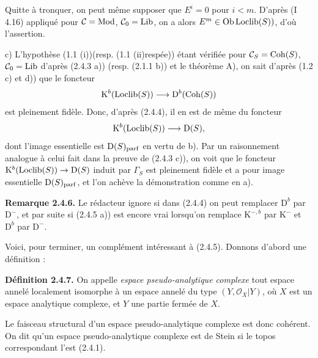 Quitte à tronquer, on peut même supposer que $E^i=0$ pour $i<m$. D'après (I 4.16) appliqué pour $\mathcal C=\Mod$, $\mathcal C_0=\Lib$, on a alors $E^m\in\Ob\Loclib(S))$, d'où l'assertion.

c) L'hypothèse (1.1 (i))(resp. (1.1 (ii)respée)) étant vérifiée pour $\mathcal C_S=\Coh(S)$, $\mathcal C_0=\Lib$ d'après (2.4.3 a)) (resp. (2.1.1 b)) et le théorème A), on sait d'après (1.2 c) et d)) que le foncteur
\[
\mathrm K^b(\Loclib(S))\longrightarrow\mathrm D^b(\Coh(S))
\]
est pleinement fidèle. Donc, d'après (2.4.4), il en est de même du foncteur
\[
\mathrm K^b(\Loclib(S))\longrightarrow\mathrm D(S),
\]
dont l'image essentielle est $\mathrm D(S)_{\parf}$ en vertu de b). Par un raisonnement analogue à celui fait dans la preuve de (2.4.3 c)), on voit que le foncteur $\mathrm K^b(\Loclib(S))\to\mathrm D(S)$ induit par $\Gamma_S$ est pleinement fidèle et a pour image essentielle $\mathrm D(S)_{\parf}$, et l'on achève la démonstration comme en a).

\textbf{Remarque 2.4.6.} Le rédacteur ignore si dans (2.4.4) on peut remplacer $\mathrm D^b$ par $\mathrm D^{-}$, et par suite si (2.4.5 a)) est encore vrai lorsqu'on remplace $\mathrm K^{-,b}$ par $\mathrm K^{-}$ et $\mathrm D^b$ par $\mathrm D^{-}$.

Voici, pour terminer, un complément intéressant à (2.4.5). Donnons d'abord une définition :

\textbf{Définition 2.4.7.} On appelle \emph{espace pseudo-analytique complexe} tout espace annelé localement isomorphe à un espace annelé du type $(Y,\mathcal O_X|Y)$, où $X$ est un espace analytique complexe, et $Y$ une partie fermée de $X$.

Le faisceau structural d'un espace pseudo-analytique complexe est donc cohérent. On dit qu'un espace pseudo-analytique complexe est de Stein si le topos correspondant l'est (2.4.1).



\providecommand{\Qcoh}{\operatorname{Qcoh}}
\providecommand{\Mod}{\operatorname{Mod}}
\providecommand{\Coh}{\operatorname{Coh}}
\renewcommand{\Ob}{\operatorname{Ob}}
\providecommand{\Hom}{\operatorname{Hom}}
\providecommand{\Ext}{\operatorname{Ext}}
\providecommand{\Spec}{\operatorname{Spec}}
\providecommand{\qcoh}{\mathrm{qcoh}}
\providecommand{\parf}{\mathrm{parf}}
\providecommand{\coh}{\mathrm{coh}}
\providecommand{\Loclib}{\operatorname{Loclib}}
\providecommand{\Lib}{\operatorname{Lib}}
\providecommand{\im}{\operatorname{Im}}

